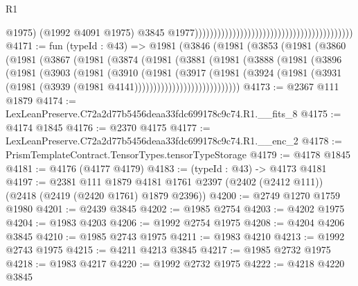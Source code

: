 \begin{lexlean}{R1}
\begin{coremodule}
                                                                                          @1975)
                                                                                        (@1992
                                                                                          @4091
                                                                                          @1975)
                                                                                        @3845
                                                                                        @1977))))))))))))))))))))))))))))))))))))))))))
@4171 := fun (typeId : @43) =>
  @1981
    (@3846
      (@1981
        (@3853
          (@1981
            (@3860
              (@1981
                (@3867
                  (@1981
                    (@3874
                      (@1981
                        (@3881
                          (@1981
                            (@3888
                              (@1981
                                (@3896
                                  (@1981
                                    (@3903
                                      (@1981
                                        (@3910
                                          (@1981
                                            (@3917
                                              (@1981
                                                (@3924
                                                  (@1981
                                                    (@3931
                                                      (@1981
                                                        (@3939
                                                          (@1981 @4141))))))))))))))))))))))))))))
@4173 := @2367 @111 @1879
@4174 := LexLeanPreserve.C72a2d77b5456deaa33fdc699178c9c74.R1.__fits_8
@4175 := @4174 @1845
@4176 := @2370 @4175
@4177 := LexLeanPreserve.C72a2d77b5456deaa33fdc699178c9c74.R1.__enc_2
@4178 := PrismTemplateContract.TensorTypes.tensorTypeStorage
@4179 := @4178 @1845
@4181 := @4176 (@4177 @4179)
@4183 := (typeId : @43) -> @4173 @4181
@4197 := @2381
    @111
    @1879
    @4181
    @1761
    @2397
    (@2402 (@2412 @111))
    (@2418 (@2419 (@2420 @1761) @1879 @2396))
@4200 := @2749 @1270 @1759 @1980
@4201 := @2439 @3845
@4202 := @1985 @2754
@4203 := @4202 @1975
@4204 := @1983 @4203
@4206 := @1992 @2754 @1975
@4208 := @4204 @4206 @3845
@4210 := @1985 @2743 @1975
@4211 := @1983 @4210
@4213 := @1992 @2743 @1975
@4215 := @4211 @4213 @3845
@4217 := @1985 @2732 @1975
@4218 := @1983 @4217
@4220 := @1992 @2732 @1975
@4222 := @4218 @4220 @3845

\end{coremodule}
\end{lexlean}
